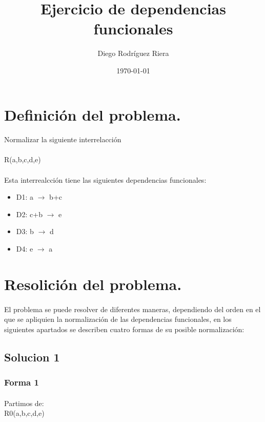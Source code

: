 \documentclass[a4paper,10pt]{article}
\title{Ejercicio de dependencias funcionales}
\author{Diego Rodríguez Riera}
\date{\today}
\begin{document}
\maketitle
\pagebreak

\section{Definición del problema.}
\paragraph{}Normalizar la siguiente interrelacción\\
\paragraph{}R(a,b,c,d,e)
\paragraph{}Esta interrealcción tiene las siguientes dependencias funcionales:
\begin{itemize}
	\item D1: a $\rightarrow$ b+c
	\item D2: c+b $\rightarrow$ e
	\item D3: b $\rightarrow$ d
	\item D4: e $\rightarrow$ a
\end{itemize}

\section{Resolición del problema.}
\paragraph{}El problema se puede resolver de diferentes maneras, dependiendo del orden en el que se apliquien la normalización de las dependencias funcionales, en los siguientes apartados se describen cuatro formas de su posible normalización:
\subsection{Solucion 1}
\subsubsection{Forma 1}
\paragraph{}Partimos de:\\
R0(a,b,c,d,e)
\end{document}
